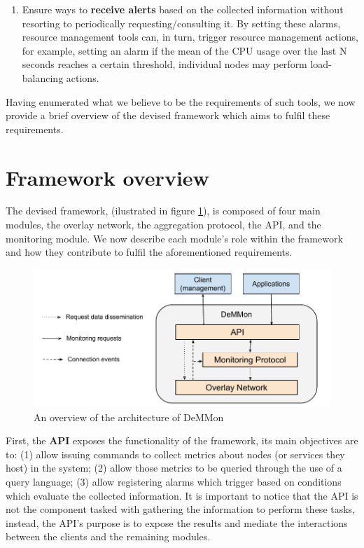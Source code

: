 \begin{enumerate}
    \item Ensure ways to \textbf{receive alerts} based on the collected information without resorting to periodically requesting/consulting it. By setting these alarms, resource management tools can, in turn, trigger resource management actions, for example, setting an alarm if the mean of the CPU usage over the last N seconds reaches a certain threshold, individual nodes may perform load-balancing actions. \label{enum:demmon_6}
    
\end{enumerate}

Having enumerated what we believe to be the requirements of such tools, we now provide a brief overview of the devised framework which aims to fulfil these requirements. 

\section{Framework overview}
\label{sec:framework_overview}


The devised framework, (ilustrated in figure \ref{fig:demmon-overview}), is composed of four main modules, the overlay network, the aggregation protocol, the API, and the monitoring module. We now describe each module's role within the framework and how they contribute to fulfil the aforementioned requirements.

\begin{figure}[htbp]
    \centering
    \includegraphics[width=\textwidth]{Chapters/Figures/DeMMon-arch-overview.pdf}
    \caption{An overview of the architecture of DeMMon}
    \label{fig:demmon-overview}
\end{figure}
    
First, the \textbf{API} exposes the functionality of the framework, its main objectives are to: (1) allow issuing commands to collect metrics about nodes (or services they host) in the system; (2) allow those metrics to be queried through the use of a query language; (3) allow registering alarms which trigger based on conditions which evaluate the collected information. It is important to notice that the API is not the component tasked with gathering the information to perform these tasks, instead, the API's purpose is to expose the results and mediate the interactions between the clients and the remaining modules.

